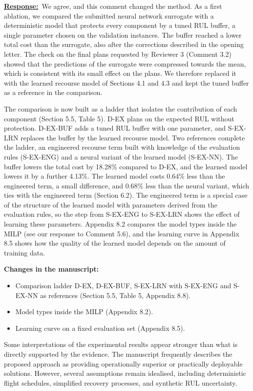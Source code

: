 \documentclass{article}
\newcommand{\response}{\vspace{0.1cm}\noindent\underline{\textbf{Response:}}\ }
\newcommand{\changes}{\vspace{0.1cm}\noindent\textbf{Changes in the manuscript:}}
\begin{document}
\response We agree, and this comment changed the method. As a first ablation, we compared the submitted neural network surrogate with a deterministic model that protects every component by a tuned RUL buffer, a single parameter chosen on the validation instances. The buffer reached a lower total cost than the surrogate, also after the corrections described in the opening letter. The check on the final plans requested by Reviewer 3 (Comment 3.2) showed that the predictions of the surrogate were compressed towards the mean, which is consistent with its small effect on the plans. We therefore replaced it with the learned recourse model of Sections 4.1 and 4.3 and kept the tuned buffer as a reference in the comparison.

The comparison is now built as a ladder that isolates the contribution of each component (Section 5.5, Table 5). D-EX plans on the expected RUL without protection. D-EX-BUF adds a tuned RUL buffer with one parameter, and S-EX-LRN replaces the buffer by the learned recourse model. Two references complete the ladder, an engineered recourse term built with knowledge of the evaluation rules (S-EX-ENG) and a neural variant of the learned model (S-EX-NN). The buffer lowers the total cost by 18.28\% compared to D-EX, and the learned model lowers it by a further 4.13\%. The learned model costs 0.64\% less than the engineered term, a small difference, and 0.68\% less than the neural variant, which ties with the engineered term (Section 6.2). The engineered term is a special case of the structure of the learned model with parameters derived from the evaluation rules, so the step from S-EX-ENG to S-EX-LRN shows the effect of learning these parameters. Appendix 8.2 compares the model types inside the MILP (see our response to Comment 5.6), and the learning curve in Appendix 8.5 shows how the quality of the learned model depends on the amount of training data.

\changes
\begin{itemize}[nosep]
\item Comparison ladder D-EX, D-EX-BUF, S-EX-LRN with S-EX-ENG and S-EX-NN as references (Section 5.5, Table 5, Appendix 8.8).
\item Model types inside the MILP (Appendix 8.2).
\item Learning curve on a fixed evaluation set (Appendix 8.5).
\end{itemize}

\begin{cmt}{}{}
Some interpretations of the experimental results appear stronger than what is directly supported by the evidence. The manuscript frequently describes the proposed approach as providing operationally superior or practically deployable solutions. However, several assumptions remain idealised, including deterministic flight schedules, simplified recovery processes, and synthetic RUL uncertainty.
\end{cmt}
\end{document}

